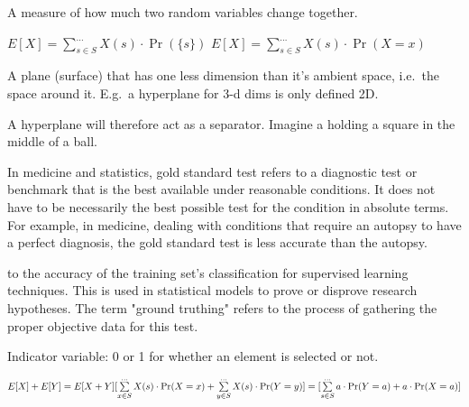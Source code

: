 \begin{definition}[Covariance]
    A measure of how much two random variables change together.

\end{definition}

\begin{definition}\label{expectedvalue}
    $E[X] = \sum\limits_{s \in S}^{\dots} X(s) \cdot \Pr(\{s\}) $ \newline
    $E[X] = \sum\limits_{s \in S}^{\dots} X(s) \cdot \Pr(X = x) $
\end{definition}

\begin{definition}[hyperplane]
    A plane (surface) that has one less dimension than it's ambient space,
    i.e.\ the space around it. E.g.\ a hyperplane for 3-d dims is only defined
    2D.

    A hyperplane will therefore act as a separator. Imagine a holding a 
    square in the middle of a ball.
\end{definition}

\begin{definition}
In medicine and statistics, gold standard test refers to a diagnostic test or
benchmark that is the best available under reasonable conditions. It does
not have to be necessarily the best possible test for the condition in absolute
terms. For example, in medicine, dealing with conditions that require an
autopsy to have a perfect diagnosis, the gold standard test is less accurate
than the autopsy.

\end{definition}

\begin{definition}
    to the accuracy of the training set's classification for supervised
    learning techniques. This is used in statistical models to prove or
    disprove research hypotheses. The term "ground truthing" refers to the
    process of gathering the proper objective data for this test.

\end{definition}

\begin{definition}
    Indicator variable: 0 or 1 for whether an element is selected or not.
\end{definition}


\begin{definition}\label{lin_expect}
    $ E[X] + E[Y] = E[X + Y] \newline
    [\sum\limits_{x \in S}^{\dots} X(s) \cdot \Pr(X = x) +
    \sum\limits_{y \in S}^{\dots} X(s) \cdot \Pr(Y = y) ] \newline
    = [\sum\limits_{s \in S}^{\dots} a \cdot \Pr(Y = a) + a \cdot \Pr(X = a) ]
    $
\end{definition}

